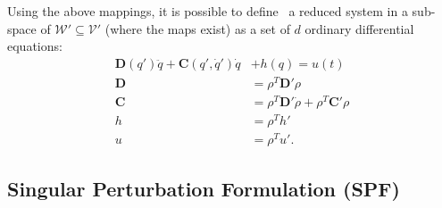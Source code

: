 \documentclass[10pt,final,journal,letterpaper,oneside,twocolumn]{IEEEtran}
\begin{document}
Using the above mappings, it is possible to
define~\cite{ghorbel_modeling_2000} a reduced system in a sub-space of
$\mathcal{W'}\subseteq \mathcal{V}'$ (where the maps exist) as a set
of $d$ ordinary differential equations:
\begin{align}
  \bm{D}(q')\ddot{q} + \bm{C}(q', \dot{q}')\dot{q} &+ h(q) =
  u(t)\nonumber\\
  \bm{D} &= \rho^T\bm{D}'\rho\nonumber\\
  \bm{C} &= \rho^T\bm{D}'\dot{\rho} + \rho^T\bm{C}'\rho\nonumber\\
  h &= \rho^T h'\nonumber\\
  u &= \rho^T u'.
  \label{eq:redmod}  
\end{align}

\subsection{Singular Perturbation Formulation (SPF)}
\label{sec:sing-pert-form}
\end{document}
